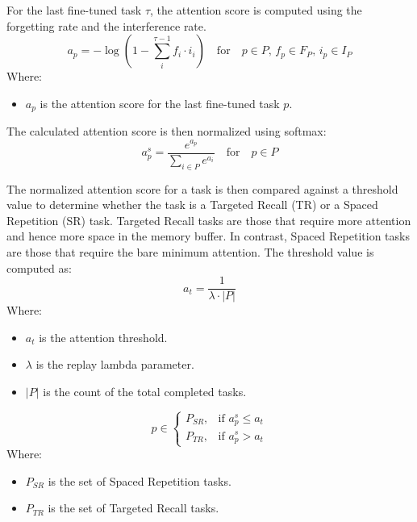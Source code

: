 \begin{enumerate}
For the last fine-tuned task \( \tau \), the attention score is computed using the forgetting rate and the interference rate.
\begin{equation} \label{attention2}
a_p = -\log\left(1 - \sum_{i}^{\tau-1} f_i \cdot i_i \right) \quad \text{for} \quad p \in P, \, f_p \in F_P, \, i_p \in I_P
\end{equation}
Where:
\begin{itemize}
    \item \( a_p \) is the attention score for the last fine-tuned task \( p \).
\end{itemize}

The calculated attention score is then normalized using softmax:
\begin{equation} \label{normalized_threshold}
a_p^s = \frac{e^{a_p}}{\sum_{i \in P} e^{a_i}} \quad \text{for} \quad p \in P
\end{equation}

The normalized attention score for a task is then compared against a threshold value to determine whether the task is a Targeted Recall (TR) or a Spaced Repetition (SR) task. Targeted Recall tasks are those that require more attention and hence more space in the memory buffer. In contrast, Spaced Repetition tasks are those that require the bare minimum attention. The threshold value is computed as:
\begin{equation} \label{threshold}
a_t = \frac{1}{\lambda \cdot |P|}
\end{equation}
Where:
\begin{itemize}
    \item \(a_t\) is the attention threshold.
    \item \(\lambda\) is the replay lambda parameter.
    \item \(|P|\) is the count of the total completed tasks.
\end{itemize}

\begin{equation} 
p \in \left\{
\begin{array}{ll}
P_{SR}, & \text{if } a_p^s \leq a_t \\
P_{TR}, & \text{if } a_p^s > a_t
\end{array}
\right.
\end{equation}
Where:
\begin{itemize}
    \item\( P_{SR} \) is the set of Spaced Repetition tasks.
    \item \( P_{TR} \) is the set of Targeted Recall tasks.
\end{itemize}


\end{enumerate}
